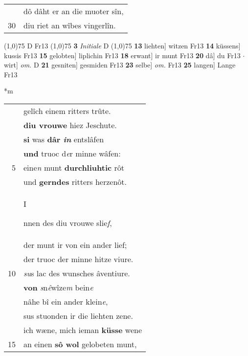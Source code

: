 \documentclass[8pt,a4paper,notitlepage]{article}
\begin{document}
\begin{table}[ht]
\begin{minipage}[t]{0.5\linewidth}
\begin{tabular}{rl}
 & dô dâht er an die muoter sîn,\\ 
30 & diu riet an wîbes vingerlîn.\\ 
\end{tabular}
\scriptsize
\line(1,0){75} \newline
D Fr13 \newline
\line(1,0){75} \newline
\textbf{3} \textit{Initiale} D  \newline
\line(1,0){75} \newline
\textbf{13} liehten] witzen Fr13 \textbf{14} küssens] kussis Fr13 \textbf{15} gelobten] liplichin Fr13 \textbf{18} erwant] ir munt Fr13 \textbf{20} dâ] du Fr13  $\cdot$ wirt] \textit{om.} D \textbf{21} gesniten] gesmiden Fr13 \textbf{23} selbe] \textit{om.} Fr13 \textbf{25} langen] Lange Fr13 \newline
\end{minipage}
\hspace{0.5cm}
\begin{minipage}[t]{0.5\linewidth}
\small
\begin{center}*m
\end{center}
\begin{tabular}{rl}
 & gelîch einem ritters trûte.\\ 
 & \textbf{diu vrouwe} hiez Jeschute.\\ 
 & \textbf{si} was \textbf{dâr \textit{in}} entslâfen\\ 
 & \textbf{und} truoc d\textit{e}r minne wâfen:\\ 
5 & eine\textit{n} munt \textbf{durchliuhtic} rôt\\ 
 & und \textbf{gerndes} ritters herzenôt.\\ 
 & \begin{large}I\end{large}nnen des diu vrouwe slie\textit{f},\\ 
 & der munt ir von ein ander lief;\\ 
 & der truoc der minne hitze viure.\\ 
10 & \textit{su}s lac des wunsches âventiure.\\ 
 & \textbf{von} \textit{s}n\textit{ê}wîze\textit{m} bein\textit{e}\\ 
 & nâhe bî ein ander klein\textit{e},\\ 
 & sus stuonden ir die liehten zene.\\ 
 & ich wæne, mich ieman \textbf{küsse} wene\\ 
15 & an einen \textbf{sô wol} gelobeten munt,\\ 

\end{tabular}
\end{minipage}
\end{table}
\end{document}
